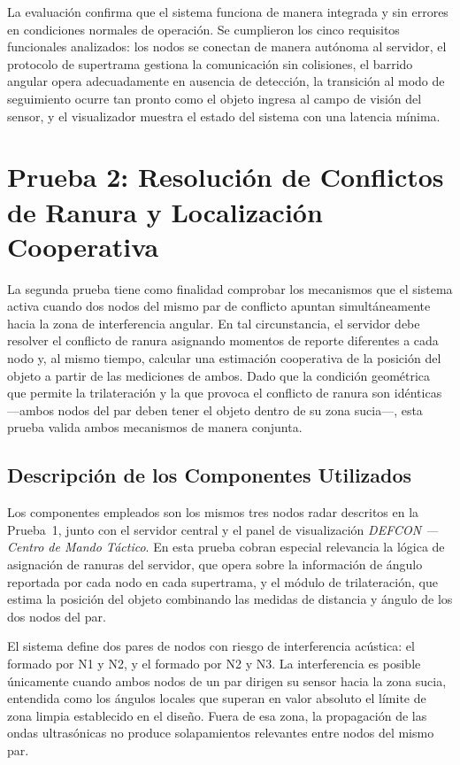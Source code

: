 La evaluación confirma que el sistema funciona de manera integrada y sin errores en condiciones normales de operación. Se cumplieron los cinco requisitos funcionales analizados: los nodos se conectan de manera autónoma al servidor, el protocolo de supertrama gestiona la comunicación sin colisiones, el barrido angular opera adecuadamente en ausencia de detección, la transición al modo de seguimiento ocurre tan pronto como el objeto ingresa al campo de visión del sensor, y el visualizador muestra el estado del sistema con una latencia mínima.

\clearpage
\section{Prueba 2: Resolución de Conflictos de Ranura y Localización Cooperativa}

La segunda prueba tiene como finalidad comprobar los mecanismos que el sistema activa cuando dos nodos del mismo par de conflicto apuntan simultáneamente hacia la zona de interferencia angular. En tal circunstancia, el servidor debe resolver el conflicto de ranura asignando momentos de reporte diferentes a cada nodo y, al mismo tiempo, calcular una estimación cooperativa de la posición del objeto a partir de las mediciones de ambos. Dado que la condición geométrica que permite la trilateración y la que provoca el conflicto de ranura son idénticas ---ambos nodos del par deben tener el objeto dentro de su zona sucia---, esta prueba valida ambos mecanismos de manera conjunta.

\subsection{Descripción de los Componentes Utilizados}

Los componentes empleados son los mismos tres nodos radar descritos en la Prueba~1, junto con el servidor central y el panel de visualización \textit{DEFCON — Centro de Mando Táctico}. En esta prueba cobran especial relevancia la lógica de asignación de ranuras del servidor, que opera sobre la información de ángulo reportada por cada nodo en cada supertrama, y el módulo de trilateración, que estima la posición del objeto combinando las medidas de distancia y ángulo de los dos nodos del par.

El sistema define dos pares de nodos con riesgo de interferencia acústica: el formado por N1 y N2, y el formado por N2 y N3. La interferencia es posible únicamente cuando ambos nodos de un par dirigen su sensor hacia la zona sucia, entendida como los ángulos locales que superan en valor absoluto el límite de zona limpia establecido en el diseño. Fuera de esa zona, la propagación de las ondas ultrasónicas no produce solapamientos relevantes entre nodos del mismo par.

